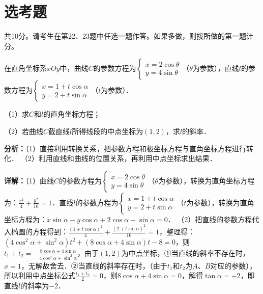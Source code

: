 \section*{选考题}
共10分。请考生在第22、23题中任选一题作答。如果多做，则按所做的第一题计分。

\begin{question}[points=10]
[选修4-4：坐标系与参数方程]

在直角坐标系$xOy$中，曲线$C$的参数方程为$\begin{cases} x=2\cos\theta \\ y=4\sin\theta \end{cases}$（$\theta$为参数），直线$l$的参数方程为$\begin{cases} x=1+t\cos\alpha \\ y=2+t\sin\alpha \end{cases}$（$t$为参数）．

（1）求$C$和$l$的直角坐标方程；

（2）若曲线$C$截直线$l$所得线段的中点坐标为$(1,2)$，求$l$的斜率．
\begin{solution}

\textbf{分析：}（1）直接利用转换关系，把参数方程和极坐标方程与直角坐标方程进行转化．
（2）利用直线和曲线的位置关系，再利用中点坐标求出结果．

\textbf{详解：}（1）曲线$C$的参数方程为$\begin{cases} x=2\cos\theta \\ y=4\sin\theta \end{cases}$（$\theta$为参数），转换为直角坐标方程为：$\frac{x^2}{4}+\frac{y^2}{16}=1$．直线$l$的参数方程为$\begin{cases} x=1+t\cos\alpha \\ y=2+t\sin\alpha \end{cases}$（$t$为参数），转换为直角坐标方程为：$x\sin\alpha-y\cos\alpha+2\cos\alpha-\sin\alpha=0$．
（2）把直线的参数方程代入椭圆的方程得到：$\frac{(1+t\cos\alpha)^2}{4}+\frac{(2+t\sin\alpha)^2}{16}=1$，整理得：$(4\cos^2\alpha+\sin^2\alpha)t^2+(8\cos\alpha+4\sin\alpha)t-8=0$，则$t_1+t_2=-\frac{8\cos\alpha+4\sin\alpha}{4\cos^2\alpha+\sin^2\alpha}$，由于$(1,2)$为中点坐标，①当直线的斜率不存在时，$x=1$，无解故舍去．②当直线的斜率存在时，（由于$t_1$和$t_2$为$A$、$B$对应的参数），所以利用中点坐标公式$\frac{t_1+t_2}{2}=0$，则$8\cos\alpha+4\sin\alpha=0$，解得$\tan\alpha=-2$，即直线$l$的斜率为$-2$．
\end{solution}
\end{question}

